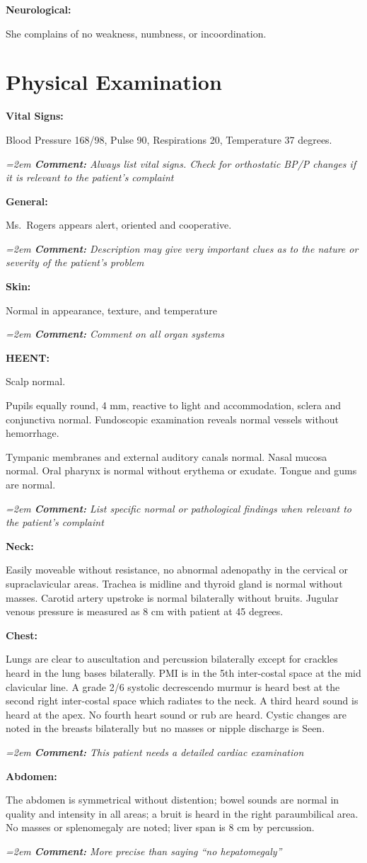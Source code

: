 \documentclass[11pt]{article}
\newcommand{\cm}[1]{%
  \par\nopagebreak\vspace{-0.2em}%
  \begingroup\small\itshape\color{cmtcolor}%
  \hangindent=2em \hangafter=0 \hspace*{1.2em}\textbf{Comment:} #1\par%
  \endgroup}
\newcommand{\lbl}[1]{\textbf{#1}\par\nopagebreak}
\begin{document}
\lbl{Neurological:}
She complains of no weakness, numbness, or incoordination.

\section*{Physical Examination}

\lbl{Vital Signs:}
Blood Pressure 168/98, Pulse 90, Respirations 20, Temperature 37 degrees.
\cm{Always list vital signs. Check for orthostatic BP/P changes if it is relevant to the patient's complaint}

\lbl{General:}
Ms.\ Rogers appears alert, oriented and cooperative.
\cm{Description may give very important clues as to the nature or severity of the patient's problem}

\lbl{Skin:}
Normal in appearance, texture, and temperature
\cm{Comment on all organ systems}

\lbl{HEENT:}
Scalp normal.

Pupils equally round, 4 mm, reactive to light and accommodation, sclera and conjunctiva normal. Fundoscopic examination reveals normal vessels without hemorrhage.

Tympanic membranes and external auditory canals normal. Nasal mucosa normal. Oral pharynx is normal without erythema or exudate. Tongue and gums are normal.
\cm{List specific normal or pathological findings when relevant to the patient's complaint}

\lbl{Neck:}
Easily moveable without resistance, no abnormal adenopathy in the cervical or supraclavicular areas. Trachea is midline and thyroid gland is normal without masses. Carotid artery upstroke is normal bilaterally without bruits. Jugular venous pressure is measured as 8 cm with patient at 45 degrees.

\lbl{Chest:}
Lungs are clear to auscultation and percussion bilaterally except for crackles heard in the lung bases bilaterally. PMI is in the 5th inter-costal space at the mid clavicular line. A grade 2/6 systolic decrescendo murmur is heard best at the second right inter-costal space which radiates to the neck. A third heard sound is heard at the apex. No fourth heart sound or rub are heard. Cystic changes are noted in the breasts bilaterally but no masses or nipple discharge is Seen.
\cm{This patient needs a detailed cardiac examination}

\lbl{Abdomen:}
The abdomen is symmetrical without distention; bowel sounds are normal in quality and intensity in all areas; a bruit is heard in the right paraumbilical area. No masses or splenomegaly are noted; liver span is 8 cm by percussion.
\cm{More precise than saying ``no hepatomegaly''}
\end{document}
